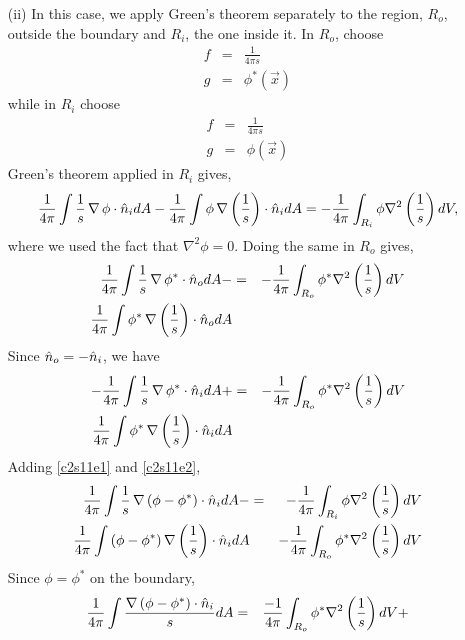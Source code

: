 \begin{enumerate}
\begin{itemize}
\item[(ii)] In this case, we apply Green's theorem separately to the region, $R_o$, outside the boundary and $R_i$, the one inside it. In $R_o$, choose
\begin{eqnarray*}
f &=& \frac{1}{4\pi s} \\
g &=& \phi^\ast(\vec{x})
\end{eqnarray*}
while in $R_i$ choose
\begin{eqnarray*}
f &=& \frac{1}{4\pi s} \\
g &=& \phi(\vec{x})
\end{eqnarray*}
Green's theorem applied in $R_i$ gives,
\begin{equation}\label{c2s11e1}
\frac{1}{4\pi}\int \frac{1}{s}\operatorname{\nabla}\phi\cdot\hat{n}_i dA - \frac{1}{4\pi}\int\phi\operatorname{\nabla}\left(\frac{1}{s}\right)\cdot\hat{n}_i dA = -\frac{1}{4\pi}\int_{R_i}\phi\nabla^2\left(\frac{1}{s}\right)dV,
\end{equation}
where we used the fact that $\nabla^2\phi = 0$. Doing the same in $R_o$ gives,
\begin{eqnarray*}
\frac{1}{4\pi}\int \frac{1}{s}\operatorname{\nabla}\phi^\ast\cdot\hat{n}_o dA - &=& -\frac{1}{4\pi}\int_{R_o}\phi^\ast\nabla^2\left(\frac{1}{s}\right)dV \\
\frac{1}{4\pi}\int\phi^\ast\operatorname{\nabla}\left(\frac{1}{s}\right)\cdot\hat{n}_o dA  & &
\end{eqnarray*}
Since $\hat{n}_o = -\hat{n}_i$, we have
\begin{eqnarray}
-\frac{1}{4\pi}\int \frac{1}{s}\operatorname{\nabla}\phi^\ast\cdot\hat{n}_i dA + &=& -\frac{1}{4\pi}\int_{R_o}\phi^\ast\nabla^2\left(\frac{1}{s}\right)dV \label{c2s11e2} \\
\frac{1}{4\pi}\int\phi^\ast\operatorname{\nabla}\left(\frac{1}{s}\right)\cdot\hat{n}_i dA & & \nonumber
\end{eqnarray}
Adding \eqref{c2s11e1} and \eqref{c2s11e2},
\begin{eqnarray*}
\frac{1}{4\pi}\int \frac{1}{s}\operatorname{\nabla}\left(\phi - \phi^\ast\right)\cdot\hat{n}_i dA - &=& -\frac{1}{4\pi}\int_{R_i}\phi\nabla^2\left(\frac{1}{s}\right)dV \\
\frac{1}{4\pi}\int\left(\phi - \phi^\ast\right)\operatorname{\nabla}\left(\frac{1}{s}\right)\cdot\hat{n}_i dA & & -\frac{1}{4\pi}\int_{R_o}\phi^\ast\nabla^2\left(\frac{1}{s}\right)dV
\end{eqnarray*}
Since $\phi = \phi^\ast$ on the boundary,
\begin{eqnarray*}
\frac{1}{4\pi}\int \frac{\grad\left(\phi - \phi^\ast\right)\cdot\un_i}{s} dA &=& \frac{-1}{4\pi}\int_{R_o}\phi^\ast\nabla^2\left(\frac{1}{s}\right)dV + \\

\end{eqnarray*}
\end{itemize}
\end{enumerate}
